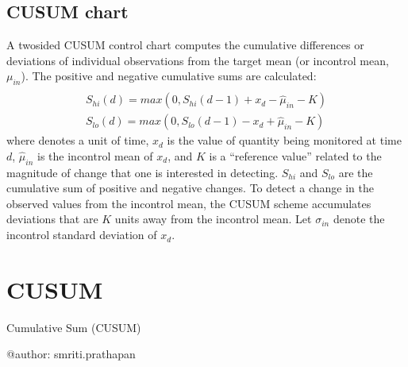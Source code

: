 \documentclass[letterpaper,10pt,oneside,english]{sphinxmanual}
\begin{document}
\subsection{CUSUM chart}
\label{\detokenize{ref_method:cusum-chart}}
\sphinxAtStartPar
A two\sphinxhyphen{}sided CUSUM control chart computes the cumulative differences or
deviations of individual observations from the target mean (or
in\sphinxhyphen{}control mean, \(\mu_{in}\)). The positive and negative cumulative
sums are calculated:
\begin{equation*}
\begin{split}\\ S_{hi}(d) = max(0, S_{hi}(d-1) + x_d  - \hat{\mu}_{in} - K)
\\ S_{lo}(d) = max(0, S_{lo}(d-1) - x_d +  \hat{\mu}_{in} - K)\end{split}
\end{equation*}
\sphinxAtStartPar
where  denotes a unit of time, \(x_d\) is the value of quantity
being monitored at time \(d\), \(\hat{\mu}_{in}\) is the
in\sphinxhyphen{}control mean of \(x_d\), and \(K\) is a “reference value”
related to the magnitude of change that one is interested in detecting.
\(S_{hi}\) and \(S_{lo}\) are the cumulative sum of positive and
negative changes. To detect a change in the observed values from the
in\sphinxhyphen{}control mean, the CUSUM scheme accumulates deviations that are
\(K\) units away from the in\sphinxhyphen{}control mean. Let \(\sigma_{in}\)
denote the in\sphinxhyphen{}control standard deviation of \(x_d\).

\sphinxstepscope


\section{CUSUM}
\label{\detokenize{ref_cusum:module-package.cusum}}\label{\detokenize{ref_cusum:cusum}}\label{\detokenize{ref_cusum::doc}}
\sphinxAtStartPar
Cumulative Sum (CUSUM)

\sphinxAtStartPar
@author: smriti.prathapan
\end{document}
